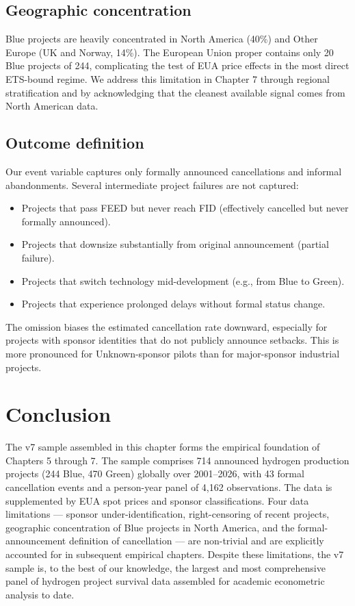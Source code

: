 \documentclass[11pt,a4paper]{article}
\begin{document}
\subsection{Geographic concentration}

Blue projects are heavily concentrated in North America (40\%) and Other Europe (UK and Norway, 14\%). The European Union proper contains only 20 Blue projects of 244, complicating the test of EUA price effects in the most direct ETS-bound regime. We address this limitation in Chapter 7 through regional stratification and by acknowledging that the cleanest available signal comes from North American data.

\subsection{Outcome definition}

Our event variable captures only formally announced cancellations and informal abandonments. Several intermediate project failures are not captured:
\begin{itemize}
    \item Projects that pass FEED but never reach FID (effectively cancelled but never formally announced).
    \item Projects that downsize substantially from original announcement (partial failure).
    \item Projects that switch technology mid-development (e.g., from Blue to Green).
    \item Projects that experience prolonged delays without formal status change.
\end{itemize}
The omission biases the estimated cancellation rate downward, especially for projects with sponsor identities that do not publicly announce setbacks. This is more pronounced for Unknown-sponsor pilots than for major-sponsor industrial projects.

\section{Conclusion}
\label{sec:ch4-conclusion}

The v7 sample assembled in this chapter forms the empirical foundation of Chapters 5 through 7. The sample comprises 714 announced hydrogen production projects (244 Blue, 470 Green) globally over 2001--2026, with 43 formal cancellation events and a person-year panel of 4{,}162 observations. The data is supplemented by EUA spot prices and sponsor classifications. Four data limitations --- sponsor under-identification, right-censoring of recent projects, geographic concentration of Blue projects in North America, and the formal-announcement definition of cancellation --- are non-trivial and are explicitly accounted for in subsequent empirical chapters. Despite these limitations, the v7 sample is, to the best of our knowledge, the largest and most comprehensive panel of hydrogen project survival data assembled for academic econometric analysis to date.
\end{document}
